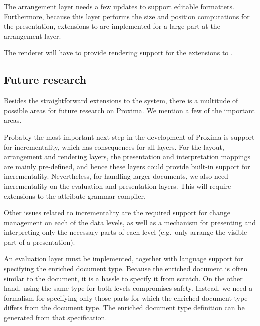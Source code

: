 The arrangement layer needs a few updates to support editable formatters. Furthermore, because this layer performs the size and position computations for the presentation, extensions to {\Xprez} are implemented for a large part at the arrangement layer.


The renderer will have to provide rendering support for the extensions to {\Xprez}.

\subsection{Future research}

Besides the straightforward extensions to the system, there is a multitude of possible areas for future research on Proxima. We mention a few of the important areas.

 Probably the most important next step in the development of Proxima is support for incrementality, which has consequences for all layers. For the layout, arrangement and rendering layers, the presentation and interpretation mappings are mainly pre-defined, and hence these layers could provide built-in support for incrementality. Nevertheless, for handling larger documents, we also need incrementality on the evaluation and presentation layers. This will require extensions to the attribute-grammar compiler. 


Other issues related to incrementality are the required support for change management on each of the data levels, as well as a mechanism for presenting and interpreting only the necessary parts of each level (e.g.\ only arrange the visible part of a presentation).



 An evaluation layer must be implemented, together with language support for specifying the enriched document type. Because the enriched document is often similar to the document, it is a hassle to specify it from scratch. On the other hand, using the same type for both levels compromises safety. Instead, we need a formalism for specifying only those parts for which the enriched document type differs from the document type. The enriched document type definition can be generated from that specification.

